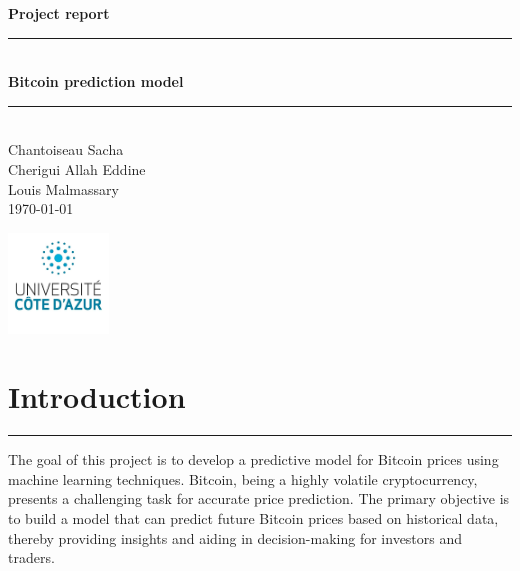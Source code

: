\documentclass{article}
\begin{document}
\begin{titlepage}
    \vspace*{\fill}
    \begin{center}
        \Large \textbf{Project report} \\
        \vspace{0.5cm}
        \rule{\textwidth}{1pt} \\
        \vspace{0.5cm}
        \Huge \textbf{Bitcoin prediction model} \\
        \vspace{0.5cm}
        \rule{\textwidth}{1pt} \\
        \vspace{1cm}
        \Large Chantoiseau Sacha\\Cherigui Allah Eddine\\Louis Malmassary\\
        \vspace{1cm}
        \normalsize \today
    \end{center}
    \vspace*{\fill}
    \begin{flushleft}
        \includegraphics[width=0.2\textwidth]{img/UCA.png}
    \end{flushleft}
\end{titlepage}

\newpage

\tableofcontents

\newpage

\section{Introduction}
\noindent\rule{\textwidth}{1pt} %
The goal of this project is to develop a predictive model for Bitcoin prices using machine learning techniques. Bitcoin, being a highly volatile cryptocurrency, presents a challenging task for accurate price prediction. The primary objective is to build a model that can predict future Bitcoin prices based on historical data, thereby providing insights and aiding in decision-making for investors and traders.
\end{document}
